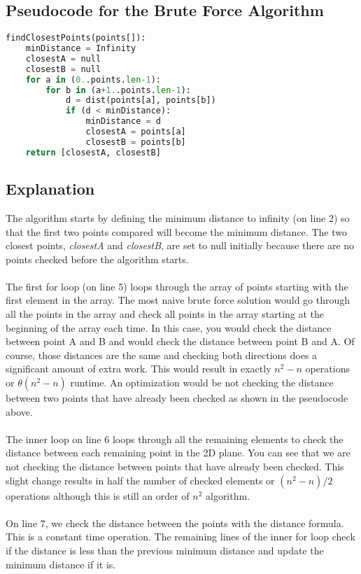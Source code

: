 \documentclass[12pt]{report}
\newcommand\mylstcaption{}
\begin{document}
\subsection*{Pseudocode for the Brute Force Algorithm}

\renewcommand\mylstcaption{Pseudocode for the Divide and Conquer Algorithm}
\begin{lstlisting}[language=Python, caption=\mylstcaption, label=lst:c1]
findClosestPoints(points[]):
	minDistance = Infinity
	closestA = null
	closestB = null
	for a in (0..points.len-1):
		for b in (a+1..points.len-1):
			d = dist(points[a], points[b])
			if (d < minDistance):
				minDistance = d
				closestA = points[a]
				closestB = points[b]
	return [closestA, closestB]
\end{lstlisting}



\subsection*{Explanation}

The algorithm starts by defining the minimum distance to infinity (on line 2) so that the first two points compared will become 
the minimum distance. The two closest points, \textit{closestA} and \textit{closestB}, are set to null initially because there are no points checked before the algorithm starts. 
\\\\
The first for loop (on line 5) loops through the array of points starting with the first element in the array. 
The most naive brute force solution would go through all the points in the array and check all points in the 
array starting at the beginning of the array each time. In this case, you would check the distance between 
point A and B and would check the distance between point B and A. Of course, those distances are the same 
and checking both directions does a significant amount of extra work. This would result in exactly $n^2-n$ 
operations or $\theta{(n^2-n)}$ runtime. An optimization would be not checking the distance between two 
points that have already been checked as shown in the pseudocode above. 
\\\\
The inner loop on line 6 loops through all the remaining elements to check the distance between each 
remaining point in the 2D plane. You can see that we are not checking the distance between points that 
have already been checked. This slight change results in half the number of checked elements or $(n^2-n)/2$
 operations although this is still an order of $n^2$ algorithm.
\\\\
On line 7, we check the distance between the points with the distance formula. This is a constant 
time operation. The remaining lines of the inner for loop check if the distance is less than the 
previous minimum distance and update the minimum distance if it is.
\end{document}
